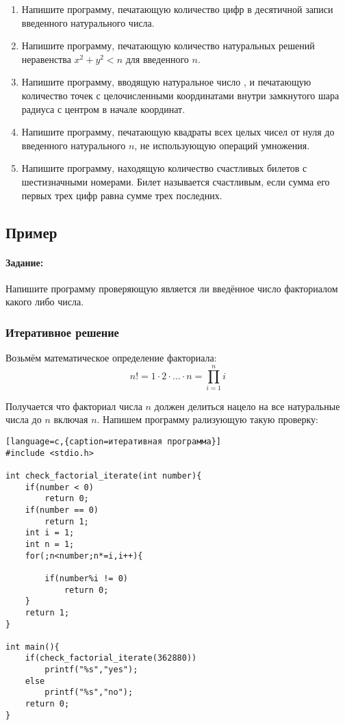 \documentclass[a4paper,12pt]{article}
\begin{document}
\begin{enumerate}
	\item Напишите программу, печатающую количество цифр в десятичной записи введенного натурального числа.
	\item Напишите программу, печатающую количество натуральных решений неравенства $x^{2}+y^{2}<n$ для введенного $n$.
	\item Напишите программу, вводящую натуральное число , и печатающую количество точек с целочисленными координатами внутри замкнутого шара радиуса с центром в начале координат.
	\item Напишите программу, печатающую квадраты всех целых чисел от нуля до введенного натурального $n$, не использующую операций умножения.
	\item Напишите программу, находящую количество счастливых билетов с шестизначными номерами. Билет называется счастливым, если сумма его первых трех цифр равна сумме трех последних.
\end{enumerate}

\subsection{Пример}
\paragraph{Задание:}
Напишите программу проверяющую является ли введённое число факториалом какого либо числа.
\subsubsection{Итеративное решение}
Возьмём математическое определение факториала:
\begin{equation}
n! = 1\cdot 2\cdot\ldots\cdot n =\prod_{i=1}^n i
\end{equation}

Получается что факториал числа $n$ должен делиться нацело на все натуральные числа до $n$ включая $n$. Напишем программу рализующую такую проверку:

\begin{lstlisting}[language=c,{caption=итеративная программа}]
#include <stdio.h>

int check_factorial_iterate(int number){
	if(number < 0) 
		return 0;
	if(number == 0) 
		return 1;
	int i = 1;
	int n = 1;
	for(;n<number;n*=i,i++){
		
		if(number%i != 0)
			return 0;
	}
	return 1;
}

int main(){
	if(check_factorial_iterate(362880))
		printf("%s","yes");
	else
		printf("%s","no");
	return 0;
}
\end{lstlisting}
\end{document}
